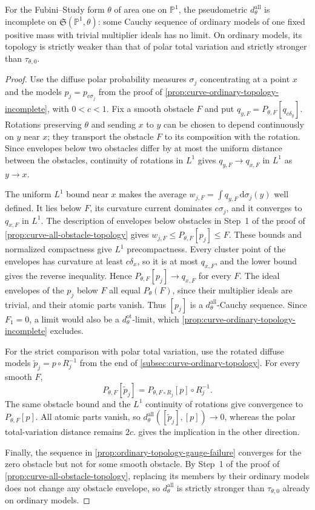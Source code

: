 \begin{proposition}\label{prop:curve-all-obstacle-incomplete}
For the Fubini--Study form $\theta$ of area one on $\mathbb P^1$, the pseudometric $d^{\mathrm{all}}_\theta$ is incomplete on $\mathfrak S(\mathbb P^1,\theta)$: some Cauchy sequence of ordinary models of one fixed positive mass with trivial multiplier ideals has no limit. On ordinary models, its topology is strictly weaker than that of polar total variation and strictly stronger than $\tau_{\theta,0}$.
\end{proposition}
\begin{proof}
Use the diffuse polar probability measures $\sigma_j$ concentrating at a point $x$ and the models $p_j=p_{c\sigma_j}$ from the proof of \cref{prop:curve-ordinary-topology-incomplete}, with $0<c<1$. Fix a smooth obstacle $F$ and put $q_{y,F}=P_{\theta,F}[q_{c\delta_y}]$. Rotations preserving $\theta$ and sending $x$ to $y$ can be chosen to depend continuously on $y$ near $x$; they transport the obstacle $F$ to its composition with the rotation. Since envelopes below two obstacles differ by at most the uniform distance between the obstacles, continuity of rotations in $L^1$ gives $q_{y,F}\to q_{x,F}$ in $L^1$ as $y\to x$.

The uniform $L^1$ bound near $x$ makes the average $w_{j,F}=\int q_{y,F}\,\mathrm d\sigma_j(y)$ well defined. It lies below $F$, its curvature current dominates $c\sigma_j$, and it converges to $q_{x,F}$ in $L^1$. The description of envelopes below obstacles in Step~1 of the proof of \cref{prop:curve-all-obstacle-topology} gives $w_{j,F}\leq P_{\theta,F}[p_j]\leq F$. These bounds and normalized compactness give $L^1$ precompactness. Every cluster point of the envelopes has curvature at least $c\delta_x$, so it is at most $q_{x,F}$, and the lower bound gives the reverse inequality. Hence $P_{\theta,F}[p_j]\to q_{x,F}$ for every $F$. The ideal envelopes of the $p_j$ below $F$ all equal $P_\theta(F)$, since their multiplier ideals are trivial, and their atomic parts vanish. Thus $[p_j]$ is a $d^{\mathrm{all}}_\theta$-Cauchy sequence. Since $F_1=0$, a limit would also be a $d^{\mathrm{ot}}_\theta$-limit, which \cref{prop:curve-ordinary-topology-incomplete} excludes.

For the strict comparison with polar total variation, use the rotated diffuse models $\widetilde p_j=p\circ R_j^{-1}$ from the end of \cref{subsec:curve-ordinary-topology}. For every smooth $F$,
\[
 P_{\theta,F}[\widetilde p_j]
   =P_{\theta,F\circ R_j}[p]\circ R_j^{-1}.
\]
The same obstacle bound and the $L^1$ continuity of rotations give convergence to $P_{\theta,F}[p]$. All atomic parts vanish, so $d^{\mathrm{all}}_\theta([\widetilde p_j],[p])\to0$, whereas the polar total-variation distance remains $2c$.  gives the implication in the other direction.

Finally, the sequence in \cref{prop:ordinary-topology-gauge-failure} converges for the zero obstacle but not for some smooth obstacle. By Step~1 of the proof of \cref{prop:curve-all-obstacle-topology}, replacing its members by their ordinary models does not change any obstacle envelope, so $d^{\mathrm{all}}_\theta$ is strictly stronger than $\tau_{\theta,0}$ already on ordinary models.
\end{proof}
